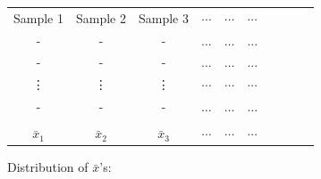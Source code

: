 \begin{figure}[H]
\begin{center}
\end{center}

\vspace{-0.5cm}
\begin{center}
\begin{tabular}{cccccccccc}
Sample 1	&	Sample 2		& Sample 3	& 	$\cdots$ & $\cdots$ & $\cdots$ \\
-		&	-			&	-		&	$\ldots$ & $\ldots$ & $\ldots$ \\
-		&	-			&	-		&	$\ldots$ & $\ldots$ & $\ldots$ \\
\vdots	&	\vdots		&	\vdots	&	$\cdots$ & $\cdots$ & $\cdots$ \\
-		&	-			&	-		&	$\ldots$ & $\ldots$ & $\ldots$ \\
\hline
\hfill\\[-0.5em]
$\bar{x}_{1}$	&	$\bar{x}_{2}$	&	$\bar{x}_{3}$	&	$\cdots$ & $\cdots$ & $\cdots$ \\
\end{tabular}
\end{center}

\vspace*{-0.1cm}
\hspace{2cm} {\normalsize{Distribution of $\bar{x}$'s:} }
%



\end{figure}
